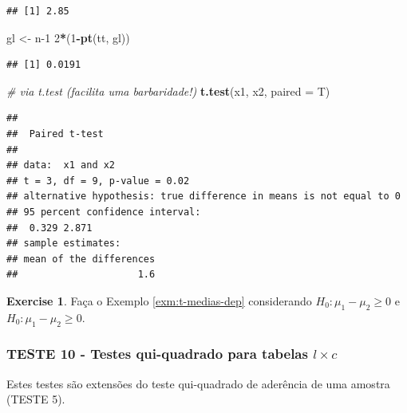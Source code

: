 \documentclass[
]{book}
\newenvironment{Shaded}{\begin{snugshade}}{\end{snugshade}}
\newcommand{\CommentTok}[1]{\textcolor[rgb]{0.56,0.35,0.01}{\textit{#1}}}
\newcommand{\DataTypeTok}[1]{\textcolor[rgb]{0.13,0.29,0.53}{#1}}
\newcommand{\DecValTok}[1]{\textcolor[rgb]{0.00,0.00,0.81}{#1}}
\newcommand{\KeywordTok}[1]{\textcolor[rgb]{0.13,0.29,0.53}{\textbf{#1}}}
\newcommand{\NormalTok}[1]{#1}
\newcommand{\OperatorTok}[1]{\textcolor[rgb]{0.81,0.36,0.00}{\textbf{#1}}}
\newcommand{\StringTok}[1]{\textcolor[rgb]{0.31,0.60,0.02}{#1}}
\theoremstyle{definition}
\theoremstyle{definition}
\theoremstyle{definition}
\newtheorem{exercise}{Exercise}[chapter]
\theoremstyle{remark}
\begin{document}
\begin{verbatim}
## [1] 2.85
\end{verbatim}

\begin{Shaded}
\begin{Highlighting}[]
\NormalTok{gl \textless{}{-}}\StringTok{ }\NormalTok{n}\DecValTok{{-}1}
\DecValTok{2}\OperatorTok{*}\NormalTok{(}\DecValTok{1}\OperatorTok{{-}}\KeywordTok{pt}\NormalTok{(tt, gl))}
\end{Highlighting}
\end{Shaded}

\begin{verbatim}
## [1] 0.0191
\end{verbatim}

\begin{Shaded}
\begin{Highlighting}[]
\CommentTok{\# via t.test (facilita uma barbaridade!)}
\KeywordTok{t.test}\NormalTok{(x1, x2, }\DataTypeTok{paired =}\NormalTok{ T)}
\end{Highlighting}
\end{Shaded}

\begin{verbatim}
## 
##  Paired t-test
## 
## data:  x1 and x2
## t = 3, df = 9, p-value = 0.02
## alternative hypothesis: true difference in means is not equal to 0
## 95 percent confidence interval:
##  0.329 2.871
## sample estimates:
## mean of the differences 
##                     1.6
\end{verbatim}

\begin{exercise}
\protect\hypertarget{exr:unnamed-chunk-110}{}{\label{exr:unnamed-chunk-110} }Faça o Exemplo \ref{exm:t-medias-dep} considerando \(H_0: \mu_1-\mu_2 \ge 0\) e \(H_0: \mu_1-\mu_2 \ge 0\).
\end{exercise}

\hypertarget{teste-10---testes-qui-quadrado-para-tabelas-l-times-c}{%
\subsubsection*{\texorpdfstring{TESTE 10 - Testes qui-quadrado para tabelas \(l \times c\)}{TESTE 10 - Testes qui-quadrado para tabelas l \textbackslash times c}}\label{teste-10---testes-qui-quadrado-para-tabelas-l-times-c}}

Estes testes são extensões do teste qui-quadrado de aderência de uma amostra (TESTE 5).
\end{document}
